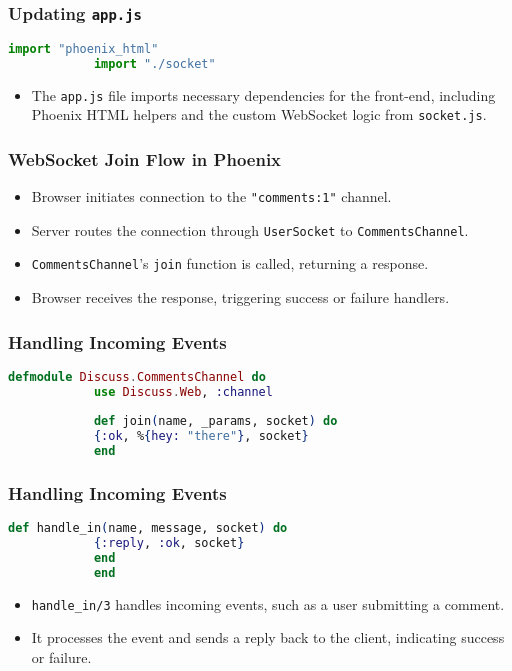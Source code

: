 \documentclass[aspectratio=169, table]{beamer}
\begin{document}
	\begin{frame}[fragile]
		\frametitle{Updating \texttt{app.js}}
		\begin{lstlisting}[language=Elixir]
			import "phoenix_html"
			import "./socket"
		\end{lstlisting}
		\begin{itemize}
			\item The \texttt{app.js} file imports necessary dependencies for the front-end, including Phoenix HTML helpers and the custom WebSocket logic from \texttt{socket.js}.
		\end{itemize}
	\end{frame}
	
	\begin{frame}
		\frametitle{WebSocket Join Flow in Phoenix}
		\begin{itemize}
			\item Browser initiates connection to the \texttt{"comments:1"} channel.
			\item Server routes the connection through \texttt{UserSocket} to \texttt{CommentsChannel}.
			\item \texttt{CommentsChannel}'s \texttt{join} function is called, returning a response.
			\item Browser receives the response, triggering success or failure handlers.
		\end{itemize}
	\end{frame}
	
	\begin{frame}[fragile]
		\frametitle{Handling Incoming Events}
		\begin{lstlisting}[language=Elixir]
			defmodule Discuss.CommentsChannel do 
			use Discuss.Web, :channel
			
			def join(name, _params, socket) do
			{:ok, %{hey: "there"}, socket}
			end
		\end{lstlisting}
	\end{frame}
	
	\begin{frame}[fragile]
		\frametitle{Handling Incoming Events}
		\begin{lstlisting}[language=Elixir]
			def handle_in(name, message, socket) do
			{:reply, :ok, socket}
			end
			end
		\end{lstlisting}
		\begin{itemize}
			\item \texttt{handle\_in/3} handles incoming events, such as a user submitting a comment.
			\item It processes the event and sends a reply back to the client, indicating success or failure.
		\end{itemize}
	\end{frame}
	
\end{document}
